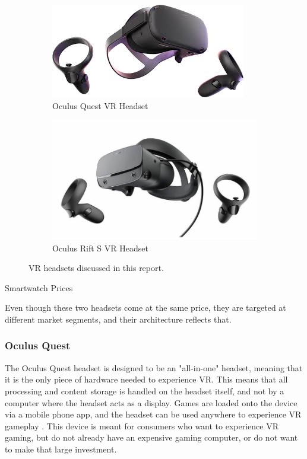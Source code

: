 \begin{figure}[h]
    \centering
    \begin{subfigure}{.5\textwidth}
      \centering
      \includegraphics[width=.6\linewidth]{media/oculus_quest.jpg}
      \caption{Oculus Quest VR Headset \cite{quest_headset}}
      \label{head:sub1}
    \end{subfigure}%
    \begin{subfigure}{.5\textwidth}
        \centering
        \includegraphics[width=.6\linewidth]{media/oculus_rifts.jpg}
        \caption{Oculus Rift S VR Headset \cite{rift_headset}}
        \label{head:sub2}
      \end{subfigure}
    \caption{VR headsets discussed in this report.}
    \label{headsets:pictures}
\end{figure}

\begin{table}[h]
    \centering
    \caption{Smartwatch Prices}
    \label{headset:price} 
\end{table}

Even though these two headsets come at the same price, they are targeted at different
market segments, and their architecture reflects that.

\subsubsection{Oculus Quest}
The Oculus Quest headset is designed to be an "all-in-one" headset, meaning
that it is the only piece of hardware needed to experience VR.
This means that all processing and content storage is handled on the headset itself,
and not by a computer where the headset acts as a display. Games are
loaded onto the device via a mobile phone app, and the headset can be used
anywhere to experience VR gameplay \cite{quest_features}. This device is
meant for consumers who want to experience VR gaming, but do not already have an
expensive gaming computer, or do not want to make that large investment.

